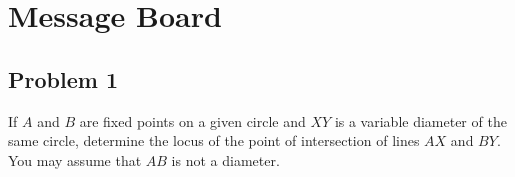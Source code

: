 \section{Message Board}

\subsection{Problem 1}

If $A$ and $B$ are fixed points on a given circle and $XY$ is a variable diameter of the same circle, determine the locus of the point of intersection of lines $AX$ and $BY$. You may assume that $AB$ is not a diameter.

